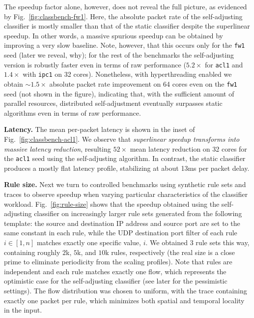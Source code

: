 The speedup factor alone, however, does not reveal the full picture, as evidenced by Fig.~\ref{fig:classbench-fw1}. Here, the absolute packet rate of the self-adjusting classifier is mostly smaller than that of the static classifier despite the superlinear speedup. In other words, a massive spurious speedup can be obtained by improving a very slow baseline.  Note, however, that this occurs only for the \texttt{fw1} seed (later we reveal, why); for the rest of the benchmarks the self-adjusting version is robustly faster even in terms of raw performance ($5.2\times$ for \texttt{acl1} and $1.4\times$ with \texttt{ipc1} on 32 cores). Nonetheless, with hyperthreading enabled we obtain $\sim\!1.5\times$ absolute packet rate improvement on 64 cores even on the \texttt{fw1} seed (not shown in the figure), indicating that, with the sufficient amount of parallel resources, distributed self-adjustment eventually surpasses static algorithms even in terms of raw performance.

\noindent
\textbf{Latency.} %
The mean per-packet latency is shown in the inset of Fig.~\ref{fig:classbench-acl1}. We observe that \emph{superlinear speedup transforms into massive latency reduction}, resulting $52\times$ mean latency reduction on 32 cores for the \texttt{acl1} seed using the self-adjusting algorithm. In contrast, the static \nftables classifier produces a mostly flat latency profile, stabilizing at about 13ms per packet delay.

\noindent
\textbf{Rule size.} %
Next we turn to controlled benchmarks using synthetic rule sets and traces to observe speedup when varying particular characteristics of the classifier workload. Fig.~\ref{fig:rule-size} shows that the speedup obtained using the self-adjusting classifier on increasingly larger rule sets generated from the following template: the source and destination IP address and source port are set to the same constant in each rule, while the UDP destination port filter of each rule $i \in [1,n]$ matches exactly one specific value, $i$. We obtained 3 rule sets this way, containing roughly $2$k, $5$k, and $10$k rules, respectively (the real size is a close prime to eliminate periodicity from the scaling profiles). Note that rules are independent and each rule matches exactly one flow, which represents the optimistic case for the self-adjusting classifier (see later for the pessimistic settings).  The flow distribution was chosen to uniform, with the trace containing exactly one packet per rule, which minimizes both spatial and temporal locality in the input.

